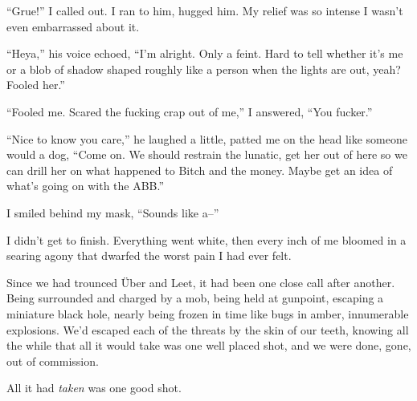 ``Grue!'' I called out.  I ran to him, hugged him.  My relief was so intense I wasn't even embarrassed about it.



``Heya,'' his voice echoed, ``I'm alright.  Only a feint.  Hard to tell whether it's me or a blob of shadow shaped roughly like a person when the lights are out, yeah?  Fooled her.''



``Fooled me.  Scared the fucking crap out of me,'' I answered, ``You fucker.''



``Nice to know you care,'' he laughed a little, patted me on the head like someone would a dog, ``Come on.  We should restrain the lunatic, get her out of here so we can drill her on what happened to Bitch and the money.  Maybe get an idea of what's going on with the ABB.''



I smiled behind my mask, ``Sounds like a--''



I didn't get to finish.  Everything went white, then every inch of me bloomed in a searing agony that dwarfed the worst pain I had ever felt.



Since we had trounced \"{U}ber and Leet, it had been one close call after another.  Being surrounded and charged by a mob, being held at gunpoint, escaping a miniature black hole, nearly being frozen in time like bugs in amber, innumerable explosions.  We'd escaped each of the threats by the skin of our teeth, knowing all the while that all it would take was one well placed shot, and we were done, gone, out of commission.



All it had \emph{taken} was one good shot.





